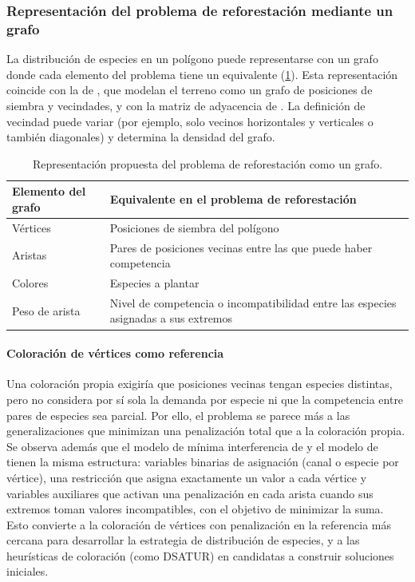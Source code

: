 \subsubsection{Representación del problema de reforestación mediante un grafo}

La distribución de especies en un polígono puede representarse con un grafo donde cada elemento del problema tiene un equivalente (\cref{tab:grafo-reforestacion}). Esta representación coincide con la de \textcite{elizalde2025}, que modelan el terreno como un grafo de posiciones de siembra y vecindades, y con la matriz de adyacencia de \textcite{liu2026}. La definición de vecindad puede variar (por ejemplo, solo vecinos horizontales y verticales o también diagonales) y determina la densidad del grafo.

\begin{table}[t]
  \centering
  \caption{Representación propuesta del problema de reforestación como un grafo.}
  \label{tab:grafo-reforestacion}
  \small
  \begin{tabularx}{\textwidth}{@{}p{3.2cm}X@{}}
    \toprule
    Elemento del grafo & Equivalente en el problema de reforestación \\
    \midrule
    Vértices & Posiciones de siembra del polígono \\
    Aristas & Pares de posiciones vecinas entre las que puede haber competencia \\
    Colores & Especies a plantar \\
    Peso de arista & Nivel de competencia o incompatibilidad entre las especies asignadas a sus extremos \\
    \bottomrule
  \end{tabularx}
\end{table}

\paragraph{Coloración de vértices como referencia} Una coloración propia exigiría que posiciones vecinas tengan especies distintas, pero no considera por sí sola la demanda por especie ni que la competencia entre pares de especies sea parcial. Por ello, el problema se parece más a las generalizaciones que minimizan una penalización total que a la coloración propia. Se observa además que el modelo de mínima interferencia de \textcite{eisenblatter2002} y el modelo de \textcite{elizalde2025} tienen la misma estructura: variables binarias de asignación (canal o especie por vértice), una restricción que asigna exactamente un valor a cada vértice y variables auxiliares que activan una penalización en cada arista cuando sus extremos toman valores incompatibles, con el objetivo de minimizar la suma. Esto convierte a la coloración de vértices con penalización en la referencia más cercana para desarrollar la estrategia de distribución de especies, y a las heurísticas de coloración (como DSATUR) en candidatas a construir soluciones iniciales.

